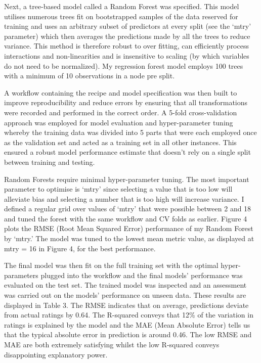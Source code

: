 \documentclass[11pt,preprint]{elsarticle}
\numberwithin{equation}{section}
\numberwithin{figure}{section}
\numberwithin{table}{section}
\begin{document}
Next, a tree-based model called a Random Forest was specified. This
model utilises numerous trees fit on bootstrapped samples of the data
reserved for training and uses an arbitrary subset of predictors at
every split (see the `mtry' parameter) which then averages the
predictions made by all the trees to reduce variance. This method is
therefore robust to over fitting, can efficiently process interactions
and non-linearities and is insensitive to scaling (by which variables do
not need to be normalized). My regression forest model employs 100 trees
with a minimum of 10 observations in a node pre split.

A workflow containing the recipe and model specification was then built
to improve reproducibility and reduce errors by ensuring that all
transformations were recorded and performed in the correct order. A
5-fold cross-validation approach was employed for model evaluation and
hyper-parameter tuning whereby the training data was divided into 5
parts that were each employed once as the validation set and acted as a
training set in all other instances. This ensured a robust model
performance estimate that doesn't rely on a single split between
training and testing.

Random Forests require minimal hyper-parameter tuning. The most
important parameter to optimise is `mtry' since selecting a value that
is too low will alleviate bias and selecting a number that is too high
will increase variance. I defined a regular grid over values of `mtry'
that were possible between 2 and 18 and tuned the forest with the same
workflow and CV folds as earlier. Figure 4 plots the RMSE (Root Mean
Squared Error) performance of my Random Forest by `mtry.' The model was
tuned to the lowest mean metric value, as displayed at mtry = 16 in
Figure 4, for the best performance.

The final model was then fit on the full training set with the optimal
hyper-parameters plugged into the workflow and the final models'
performance was evaluated on the test set. The trained model was
inspected and an assessment was carried out on the models' performance
on unseen data. These results are displayed in Table 3. The RMSE
indicates that on average, predictions deviate from actual ratings by
0.64. The R-squared conveys that 12\% of the variation in ratings is
explained by the model and the MAE (Mean Absolute Error) tells us that
the typical absolute error in prediction is around 0.46. The low RMSE
and MAE are both extremely satisfying whilst the low R-squared conveys
disappointing explanatory power.
\end{document}
